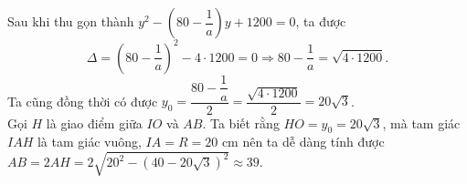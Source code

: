 \begin{ex}
{{
		}\noindent
		Sau khi thu gọn thành $y^2 - \left( 80-\dfrac{1}{a}\right)y+1200=0$, ta được
		\[\Delta = \left( 80-\dfrac{1}{a}\right)^2-4\cdot 1200 =0 \Rightarrow 80-\dfrac{1}{a} = \sqrt{4\cdot 1200}.\]
		Ta cũng đồng thời có được $y_0= \dfrac{80-\dfrac{1}{a}}{2}=\dfrac{\sqrt{4\cdot 1200}}{2} = 20\sqrt{3}$.\\
		Gọi $H$ là giao điểm giữa $IO$ và $AB$. Ta biết rằng $HO = y_0 = 20\sqrt{3}$, mà tam giác $IAH$ là tam giác vuông, $IA = R = 20$ cm nên ta dễ dàng tính được $AB = 2AH = 2\sqrt{20^2-\left( 40-20\sqrt{3}\right)^2} \approx 39$.
	}
\end{ex}

